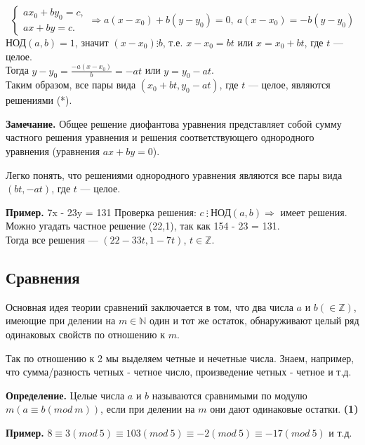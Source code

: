 \documentclass{article}
\begin{document}
    \[ \begin{cases}
        ax_0 + by_0 = c,\\
        ax + by = c.
    \end{cases} \Rightarrow a(x - x_0) + b(y - y_0) = 0,\ a(x - x_0) = -b(y - y_0) \]
    \( \textrm{НОД}(a,b) = 1 \), значит \( (x - x_0) \vdots b \), т.е. \( x - x_0 = bt \) или \( x = x_0 + bt \), где \( t \) --- целое.\\
    Тогда \( y - y_0 = \frac{-a(x - x_0)}{b} = -at \) или \( y = y_0 - at \).\\
    Таким образом, все пары вида \( (x_0 + bt, y_0 - at) \), где \( t \) --- целое, являются решениями (*).

    \textbf{Замечание.} Общее решение диофантова уравнения представляет собой сумму частного решения уравнения и решения соответствующего однородного уравнения (уравнения \( ax + by = 0 \)).

    Легко понять, что решениями однородного уравнения являются все пары вида \( (bt, -at) \), где \( t \) --- целое.

    \textbf{Пример.} 7x - 23y = 131
    Проверка решения: \( c\ \vdots \ \textrm{НОД}(a,b) \Rightarrow \) имеет решения.\\ 
    Можно угадать частное решение (22,1), так как 154 - 23 = 131.\\
    Тогда все решения --- \( (22-33t,1-7t) \), \( t \in \mathbb{Z} \).

    \subsection{Сравнения}

    Основная идея теории сравнений заключается в том, что два числа \( a \) и \( b (\in \mathbb{Z}) \), имеющие при делении на \( m \in \mathbb{N} \) один и тот же остаток, обнаруживают целый ряд одинаковых свойств по отношению к \( m \).

    Так по отношению к 2 мы выделяем четные и нечетные числа. Знаем, например, что сумма/разность четных - четное число, произведение четных - четное и т.д.

    \textbf{Определение.} Целые числа \( a \) и \( b \) называются сравнимыми по модулю \( m (a \equiv b (mod\ m)) \), если при делении на \( m \) они дают одинаковые остатки. \textbf{(1)}
    
    \textbf{Пример.} \( 8 \equiv 3 (mod\ 5) \equiv 103 (mod\ 5) \equiv -2 (mod\ 5) \equiv -17 (mod\ 5) \) и т.д.
\end{document}
